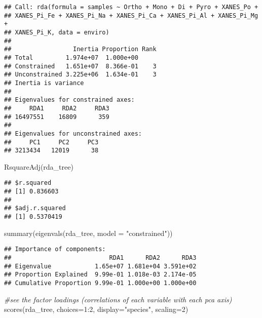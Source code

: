 \documentclass[
]{article}
\newenvironment{Shaded}{\begin{snugshade}}{\end{snugshade}}
\newcommand{\AttributeTok}[1]{\textcolor[rgb]{0.77,0.63,0.00}{#1}}
\newcommand{\CommentTok}[1]{\textcolor[rgb]{0.56,0.35,0.01}{\textit{#1}}}
\newcommand{\DecValTok}[1]{\textcolor[rgb]{0.00,0.00,0.81}{#1}}
\newcommand{\FunctionTok}[1]{\textcolor[rgb]{0.00,0.00,0.00}{#1}}
\newcommand{\NormalTok}[1]{#1}
\newcommand{\SpecialCharTok}[1]{\textcolor[rgb]{0.00,0.00,0.00}{#1}}
\newcommand{\StringTok}[1]{\textcolor[rgb]{0.31,0.60,0.02}{#1}}
\begin{document}
\begin{verbatim}
## Call: rda(formula = samples ~ Ortho + Mono + Di + Pyro + XANES_Po +
## XANES_Pi_Fe + XANES_Pi_Na + XANES_Pi_Ca + XANES_Pi_Al + XANES_Pi_Mg +
## XANES_Pi_K, data = enviro)
## 
##                 Inertia Proportion Rank
## Total         1.974e+07  1.000e+00     
## Constrained   1.651e+07  8.366e-01    3
## Unconstrained 3.225e+06  1.634e-01    3
## Inertia is variance 
## 
## Eigenvalues for constrained axes:
##     RDA1     RDA2     RDA3 
## 16497551    16809      359 
## 
## Eigenvalues for unconstrained axes:
##     PC1     PC2     PC3 
## 3213434   12019      38
\end{verbatim}

\begin{Shaded}
\begin{Highlighting}[]
\FunctionTok{RsquareAdj}\NormalTok{(rda\_tree)}
\end{Highlighting}
\end{Shaded}

\begin{verbatim}
## $r.squared
## [1] 0.836603
## 
## $adj.r.squared
## [1] 0.5370419
\end{verbatim}

\begin{Shaded}
\begin{Highlighting}[]
\FunctionTok{summary}\NormalTok{(}\FunctionTok{eigenvals}\NormalTok{(rda\_tree, }\AttributeTok{model =} \StringTok{"constrained"}\NormalTok{))}
\end{Highlighting}
\end{Shaded}

\begin{verbatim}
## Importance of components:
##                           RDA1      RDA2      RDA3
## Eigenvalue            1.65e+07 1.681e+04 3.591e+02
## Proportion Explained  9.99e-01 1.018e-03 2.174e-05
## Cumulative Proportion 9.99e-01 1.000e+00 1.000e+00
\end{verbatim}

\begin{Shaded}
\begin{Highlighting}[]
\CommentTok{\#see the factor loadings (correlations of each variable with each pca axis)}
\FunctionTok{scores}\NormalTok{(rda\_tree, }\AttributeTok{choices=}\DecValTok{1}\SpecialCharTok{:}\DecValTok{2}\NormalTok{, }\AttributeTok{display=}\StringTok{"species"}\NormalTok{, }\AttributeTok{scaling=}\DecValTok{2}\NormalTok{)}
\end{Highlighting}
\end{Shaded}
\end{document}
